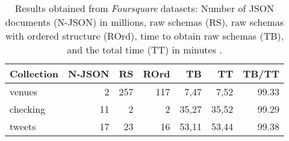 
\begin{table}[ht]
  \caption{Results obtained from \textit{Foursquare} datasets: Number of JSON documents (N-JSON) in millions, raw schemas (RS), raw schemas with ordered structure (ROrd), time to obtain raw schemas (TB), and the total time  (TT) in minutes \cite{8424731}.}
  \label{tab:foursquare}
  \begin{tabular}{lrrrrrr}
    \toprule
    Collection & N-JSON &  RS & ROrd &   TB &    TT & TB/TT \\
    \midrule
    venues     &      2 & 257 & 117 &  7,47 &  7,52 & 99.33 \\
    checking   &     11 &   2 &   2 & 35,27 & 35,52 & 99.29 \\
    tweets     &     17 &  23 &  16 & 53,11 & 53,44 & 99.38 \\
    \bottomrule
\end{tabular}
\end{table}